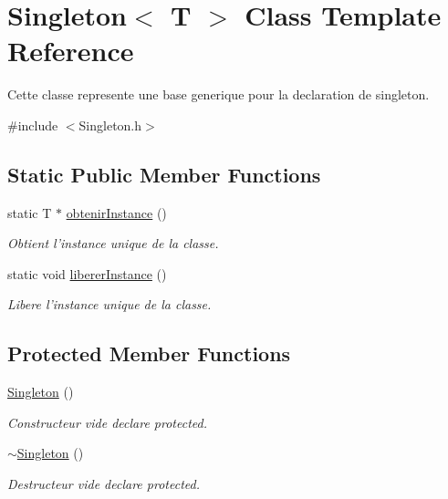\hypertarget{class_singleton}{\section{Singleton$<$ T $>$ Class Template Reference}
\label{class_singleton}
}


Cette classe represente une base generique pour la declaration de singleton.  




{\ttfamily \#include $<$Singleton.\-h$>$}

\subsection*{Static Public Member Functions}
\begin{DoxyCompactItemize}
\item 
static T $\ast$ \hyperlink{group__utilitaire_ga349c289d77c484b8b4a180843d968b46}{obtenir\-Instance} ()
\begin{DoxyCompactList}\small\item\em Obtient l'instance unique de la classe. \end{DoxyCompactList}\item 
static void \hyperlink{group__utilitaire_ga2b9ae943a004663d769be3f08ae35a0f}{liberer\-Instance} ()
\begin{DoxyCompactList}\small\item\em Libere l'instance unique de la classe. \end{DoxyCompactList}\end{DoxyCompactItemize}
\subsection*{Protected Member Functions}
\begin{DoxyCompactItemize}
\item 
\hypertarget{class_singleton_a923b995920da9c06590adb170ab2f890}{\hyperlink{class_singleton_a923b995920da9c06590adb170ab2f890}{Singleton} ()}\label{class_singleton_a923b995920da9c06590adb170ab2f890}

\begin{DoxyCompactList}\small\item\em Constructeur vide declare protected. \end{DoxyCompactList}\item 
\hypertarget{class_singleton_ac6e7af82cba33f561bd64e5e0243e7f8}{\hyperlink{class_singleton_ac6e7af82cba33f561bd64e5e0243e7f8}{$\sim$\-Singleton} ()}\label{class_singleton_ac6e7af82cba33f561bd64e5e0243e7f8}

\begin{DoxyCompactList}\small\item\em Destructeur vide declare protected. \end{DoxyCompactList}\end{DoxyCompactItemize}


